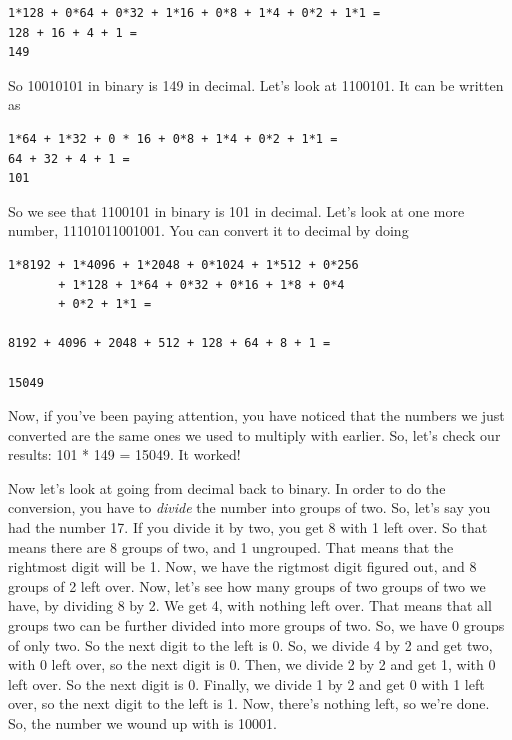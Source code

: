 \begin{simpletyping}
\begin{lstlisting}
1*128 + 0*64 + 0*32 + 1*16 + 0*8 + 1*4 + 0*2 + 1*1 =
128 + 16 + 4 + 1 = 
149
\end{lstlisting}
\end{simpletyping}

So 10010101 in binary is 149 in decimal.  Let's look at 1100101.  It
can be written as

\begin{simpletyping}
\begin{lstlisting}
1*64 + 1*32 + 0 * 16 + 0*8 + 1*4 + 0*2 + 1*1 =
64 + 32 + 4 + 1 =
101
\end{lstlisting}
\end{simpletyping}

So we see that 1100101 in binary is 101 in decimal.  Let's look at
one more number, 11101011001001.  You can convert it to decimal by doing

\begin{simpletyping}
\begin{lstlisting}
1*8192 + 1*4096 + 1*2048 + 0*1024 + 1*512 + 0*256 
       + 1*128 + 1*64 + 0*32 + 0*16 + 1*8 + 0*4 
       + 0*2 + 1*1 =

8192 + 4096 + 2048 + 512 + 128 + 64 + 8 + 1 =

15049
\end{lstlisting}
\end{simpletyping}

Now, if you've been paying attention, you have noticed that the numbers
we just converted are the same ones we used to multiply with earlier.
So, let's check our results: 101 * 149 = 15049.  It worked!

Now let's look at going from decimal back to binary.  In order to do
the conversion, you have to \emph{divide} the number
into groups of two.  So, let's say you had the number 17.  If you
divide it by two, you get 8 with 1 left over.  So that means there are
8 groups of two, and 1 ungrouped.  That means that the rightmost digit
will be 1.  Now, we have the rigtmost digit figured out, and 8 groups
of 2 left over.  Now, let's see how many groups of two groups of two we 
have, by dividing 8 by 2.  We get 4, with nothing left over.  That
means that all groups two can be further divided into more groups of
two.  So, we have 0 groups of only two.  So the next digit to the
left is 0.  So, we divide 4 by 2 and get two, with 0 left over, so
the next digit is 0.  Then, we divide 2 by 2 and get 1, with 0 left over.
So the next digit is 0.  Finally, we divide 1 by 2 and get 0 with 1
left over, so the next digit to the left is 1.  Now, there's nothing
left, so we're done.  So, the number we wound up with is 10001.

